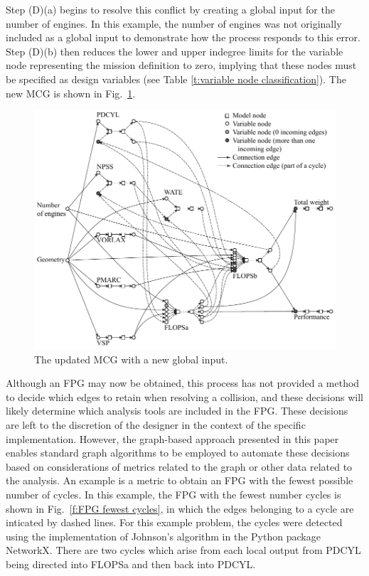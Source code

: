 Step (D)(a) begins to resolve this conflict by creating a global input for the number of engines. In this example, the number of engines was not originally included as a global input to demonstrate how the process responds to this error.
Step (D)(b) then reduces the lower and upper indegree limits for the variable node representing the mission definition to zero, implying that these nodes must be specified as design variables (see Table \ref{t:variable node classification}). The new MCG is shown in Fig.~\ref{f:MCG}.
	\begin{figure}[htb!]
	  \begin{center}
		\includegraphics[width=6in]{images/MCG_edit}
	  \end{center}
	  \caption{The updated MCG with a new global input.}
	\label{f:MCG}
	\end{figure}

	Although an FPG may now be obtained, this process has not provided a method to decide which edges to retain when resolving a collision, and these decisions will likely determine which analysis tools are included in the FPG. These decisions are left to the discretion of the designer in the context of the specific implementation. 
	However, the graph-based approach presented in this paper enables standard graph algorithms to be employed to automate these decisions based on considerations of metrics related to the graph or other data related to the analysis. 
	An example is a metric to obtain an FPG with the fewest possible number of cycles. 
In this example, the FPG with the fewest number cycles is shown in Fig.~\ref{f:FPG fewest cycles}, in which the edges belonging to a cycle are inticated by dashed lines. 
For this example problem, the cycles were detected using the implementation of Johnson's algorithm \cite{Johnson1975} in the Python package NetworkX. 
There are two cycles which arise from each local output from PDCYL being directed into FLOPSa and then back into PDCYL. 

